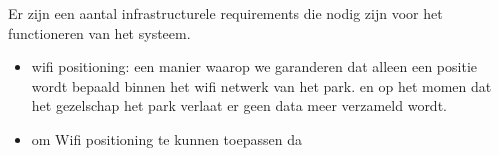 Er zijn een aantal infrastructurele requirements die nodig zijn voor het functioneren van het systeem.
\begin{itemize}
    \item wifi positioning: een manier waarop we garanderen dat alleen een positie wordt bepaald binnen het wifi netwerk van het park. en op het momen dat het gezelschap het park verlaat er geen data meer verzameld wordt.
    \item om Wifi positioning te kunnen toepassen da
\end{itemize}
